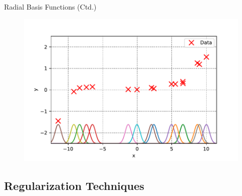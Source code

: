 \begin{frame}{Radial Basis Functions (Ctd.)}{}
	\vspace{-3mm}
	\begin{figure}
		\includegraphics[scale=0.55]{05_regression/02_img/non_linear_data_rbf}
	\end{figure}
\end{frame}


\subsection{Regularization Techniques}

